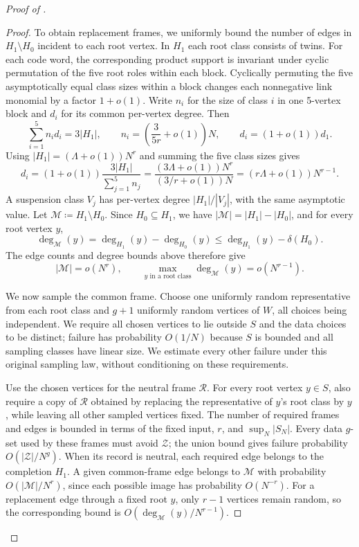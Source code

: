 \documentclass[10pt]{article}
\numberwithin{equation}{section}
\theoremstyle{definition}
\begin{document}
\begin{proof}[Proof of ]
\begin{proof}
To obtain replacement frames, we uniformly bound the number of edges in $H_1\setminus H_0$ incident to each root vertex. In $H_1$ each root class consists of twins. For each code word, the corresponding product support is invariant under cyclic permutation of the five root roles within each block. Cyclically permuting the five asymptotically equal class sizes within a block changes each nonnegative link monomial by a factor $1+o(1)$. Write $n_i$ for the size of class $i$ in one 5-vertex block and $d_i$ for its common per-vertex degree. Then
\[
 \sum_{i=1}^5 n_id_i=3|H_1|,\qquad
 n_i=\left(\frac{3}{5r}+o(1)\right)N,\qquad
 d_i=(1+o(1))d_1.
\]
Using $|H_1|=(\Lambda+o(1))N^r$ and summing the five class sizes gives
\[
 d_i=(1+o(1))\frac{3|H_1|}{\sum_{j=1}^5n_j}
 =\frac{(3\Lambda+o(1))N^r}{(3/r+o(1))N}
 =(r\Lambda+o(1))N^{r-1}.
\]
A suspension class $V_j$ has per-vertex degree $|H_1|/|V_j|$, with the same asymptotic value. Let $\mathcal M\coloneqq H_1\setminus H_0$. Since $H_0\subseteq H_1$, we have $|\mathcal M|=|H_1|-|H_0|$, and for every root vertex $y$,
\[
 \deg_{\mathcal M}(y)=\deg_{H_1}(y)-\deg_{H_0}(y)
       \le\deg_{H_1}(y)-\delta(H_0).
\]
The edge counts and degree bounds above therefore give
\begin{equation}\label{eq:rootmissing}
 |\mathcal M|=o(N^r),\qquad
 \max_{y\text{ in a root class}}\deg_{\mathcal M}(y)=o(N^{r-1}).
\end{equation}

We now sample the common frame. Choose one uniformly random representative from each root class and $g+1$ uniformly random vertices of $W$, all choices being independent. We require all chosen vertices to lie outside $S$ and the data choices to be distinct; failure has probability $O(1/N)$ because $S$ is bounded and all sampling classes have linear size. We estimate every other failure under this original sampling law, without conditioning on these requirements.

Use the chosen vertices for the neutral frame $\mathscr R$. For every root vertex $y\in S$, also require a copy of $\mathscr R$ obtained by replacing the representative of $y$'s root class by $y$, while leaving all other sampled vertices fixed. The number of required frames and edges is bounded in terms of the fixed input, $r$, and $\sup_N|S_N|$. Every data $g$-set used by these frames must avoid $\mathcal Z$; the union bound gives failure probability $O(|\mathcal Z|/N^g)$. When its record is neutral, each required edge belongs to the completion $H_1$. A given common-frame edge belongs to $\mathcal M$ with probability $O(|\mathcal M|/N^r)$, since each possible image has probability $O(N^{-r})$. For a replacement edge through a fixed root $y$, only $r-1$ vertices remain random, so the corresponding bound is $O(\deg_{\mathcal M}(y)/N^{r-1})$.


\end{proof}
\end{proof}
\end{document}
